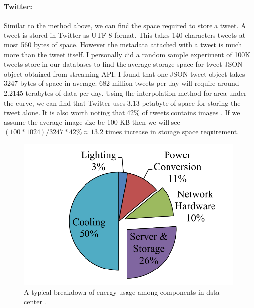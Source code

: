 \vspace{-2mm}
\paragraph{Twitter:}
Similar to the method above, we can find the space required to store a tweet. A
tweet is stored in Twitter as UTF-8 format. This takes 140 characters tweets at
most 560 bytes of space. However the metadata attached with a tweet is much
more than the tweet itself. I personally did a random sample experiment of 100K
tweets store in our databases to find the average storage space for tweet JSON
object obtained from streaming API. I found that one JSON tweet object takes
3247 bytes of space in average.  682 million tweets per day will require around
2.2145 terabytes of data per day. Using the interpolation method for area under
the curve, we can find that Twitter uses 3.13 petabyte of space for storing the
tweet alone. It is also worth noting that 42\% of tweets contains images
\cite{tweets_images}. If we assume the average image size be 100 KB then we
will see $(100 * 1024)/3247 * 42 \% \approx 13.2$ times increase in storage
space requirement.

\begin{figure}[t]
	\includegraphics[width=0.7\linewidth ]{fig/energy_usage.png}
    \vspace{-2mm}
    \caption{A typical breakdown of energy usage among components in data center \cite{info2007top}.}
    \label{fig:energy_usage}
\end{figure}

